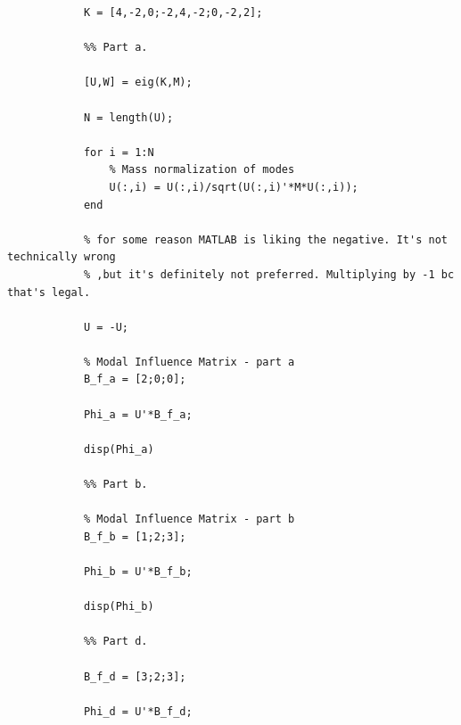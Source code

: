 \documentclass{article}
\begin{document}
\begin{enumerate}
\begin{lstlisting}[style=Matlab-editor]
            % Stiffness Matrix
            K = [4,-2,0;-2,4,-2;0,-2,2];
            
            %% Part a.
            
            [U,W] = eig(K,M);
            
            N = length(U);
            
            for i = 1:N
                % Mass normalization of modes
                U(:,i) = U(:,i)/sqrt(U(:,i)'*M*U(:,i));
            end
            
            % for some reason MATLAB is liking the negative. It's not technically wrong
            % ,but it's definitely not preferred. Multiplying by -1 bc that's legal.
            
            U = -U;
            
            % Modal Influence Matrix - part a
            B_f_a = [2;0;0];
            
            Phi_a = U'*B_f_a;
            
            disp(Phi_a)
            
            %% Part b.
            
            % Modal Influence Matrix - part b
            B_f_b = [1;2;3];
            
            Phi_b = U'*B_f_b;
            
            disp(Phi_b)
            
            %% Part d.
            
            B_f_d = [3;2;3];
            
            Phi_d = U'*B_f_d;
            

\end{lstlisting}
\end{enumerate}
\end{document}
